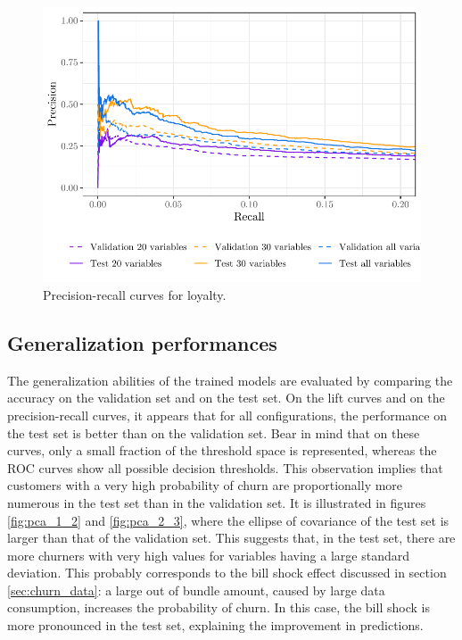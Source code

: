 \begin{figure}
    \centering
    \includegraphics[width=0.9\linewidth]{figures/pr_loy.pdf}
    \caption{Precision-recall curves for loyalty.}
    \label{fig:pr_loy}
\end{figure}

\subsection{Generalization performances}

The generalization abilities of the trained models are evaluated by comparing the
accuracy on the validation set and on the test set. On the lift curves and on
the precision-recall curves, it appears that for all configurations, the
performance on the test set is better than on the validation set. Bear in mind
that on these curves, only a small fraction of the threshold space is
represented, whereas the ROC curves show all possible decision thresholds. This
observation implies that customers with a very high probability of churn are
proportionally more numerous in the test set than in the validation set. It is
illustrated in figures \ref{fig:pca_1_2} and \ref{fig:pca_2_3}, where the
ellipse of covariance of the test set is larger than that of the validation set.
This suggests that, in the test set, there are more churners with very high
values for variables having a large standard deviation. This probably
corresponds to the bill shock effect discussed in section \ref{sec:churn_data}:
a large out of bundle amount, caused by large data consumption, increases
the probability of churn. In this case, the bill shock is more pronounced in
the test set, explaining the improvement in predictions.

